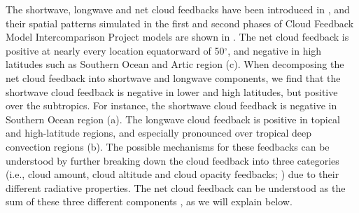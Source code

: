 The shortwave, longwave and net cloud feedbacks have been introduced in , and their spatial patterns simulated in the first and second phases of Cloud Feedback Model Intercomparison Project \citep[CFMIP;][]{Webb2017cfmip} models are shown in . The net cloud feedback is positive at nearly every location equatorward of 50$^\circ$, and negative in high latitudes such as Southern Ocean and Artic region (c). When decomposing the net cloud feedback into shortwave and longwave components, we find that the shortwave cloud feedback is negative in lower and high latitudes, but positive over the subtropics. For instance, the shortwave cloud feedback is negative in Southern Ocean region (a). The longwave cloud feedback is positive in topical and high-latitude regions, and especially pronounced over tropical deep convection regions (b). The possible mechanisms for these feedbacks can be understood by further breaking down the cloud feedback into three categories (i.e., cloud amount, cloud altitude and cloud opacity feedbacks; \citealt{Zelinka2012computing2}) due to their different radiative properties. The net cloud feedback can be understood as the sum of these three different components \citep{Zelinka2012computing2}, as we will explain below. %


